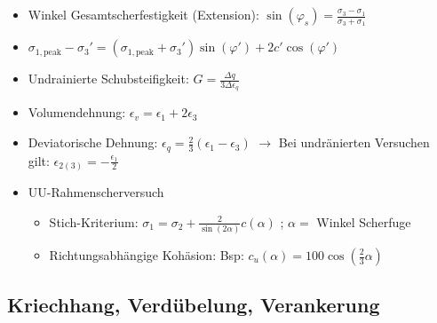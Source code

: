 \documentclass[fleqn,twoside]{article}
\begin{document}
\begin{itemize}
	\item Winkel Gesamtscherfestigkeit (Extension): $\sin(\varphi_s)=\frac{\sigma_3-\sigma_1}{\sigma_3+\sigma_1}$
	\item $\sigma_{1,\text{peak}}-\sigma_{3}'=(\sigma_{1,\text{peak}}+\sigma_{3}')\sin(\varphi')+2c'\cos(\varphi')$
	\item Undrainierte Schubsteifigkeit: $G= \frac{\Delta q}{3 \Delta \epsilon_q}$
	\item Volumendehnung: $\epsilon_{v}=\epsilon_1 + 2\epsilon_3$
	\item Deviatorische Dehnung: $\epsilon_q = \frac{2}{3}(\epsilon_1 - \epsilon_3)$
	$\rightarrow$ Bei undränierten Versuchen gilt: $\epsilon_{2(3)}=-\frac{\epsilon_1}{2}$
	\item UU-Rahmenscherversuch
	\begin{itemize}
	    \item Stich-Kriterium: $\sigma_1 = \sigma_2 + \frac{2}{\sin(2 \alpha)} c(\alpha)$ ; $\alpha =$ Winkel Scherfuge
	    \item Richtungsabhängige Kohäsion: Bsp: $c_u(\alpha) = 100 \cos(\frac{2}{3} \alpha)$
	\end{itemize}
\end{itemize}

\subsection{Kriechhang, Verdübelung, Verankerung}
		
\end{document}

